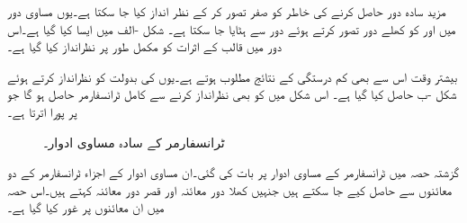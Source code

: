 مزید سادہ دور حاصل کرنے کی خاطر  کو صفر تصور کر کے  نظر انداز کیا جا  سکتا ہے۔یوں مساوی دور میں  اور  کو کھلے دور تصور کرتے ہوئے  دور سے  ہٹایا جا سکتا ہے۔ شکل -الف  میں ایسا کیا گیا ہے۔اس دور میں قالب کے اثرات کو مکمل طور پر نظرانداز کیا گیا ہے۔

بیشتر وقت  اس سے بھی کم درستگی کے نتائج مطلوب ہوتے ہے۔یوں  کی بدولت   کو  نظرانداز کرتے ہوئے  شکل -ب حاصل کیا گیا ہے۔ اس شکل میں  کو بھی نظرانداز کرنے سے کامل ٹرانسفارمر حاصل ہو گا جو   پر پورا اترتا ہے۔


\begin{figure}
\centering
\begin{subfigure}{0.6\textwidth}
\centering
{}
\caption{}
\end{subfigure}%
\begin{subfigure}{0.4\textwidth}
\centering
{}
\caption{}
\end{subfigure}
\caption{ٹرانسفارمر کے سادہ مساوی ادوار۔}
\label{شکل_ٹرانسفارمر_سادہ_ماڈل}
\end{figure}
گزشتہ حصہ میں  ٹرانسفارمر کے مساوی ادوار پر بات کی گئی۔ان مساوی ادوار  کے اجزاء ٹرانسفارمر کے دو معائنوں سے حاصل کیے جا سکتے ہیں جنہیں  کھلا دور معائنہ اور قصر دور معائنہ کہتے ہیں۔اس حصہ میں ان معائنوں پر غور کیا گیا ہے۔

